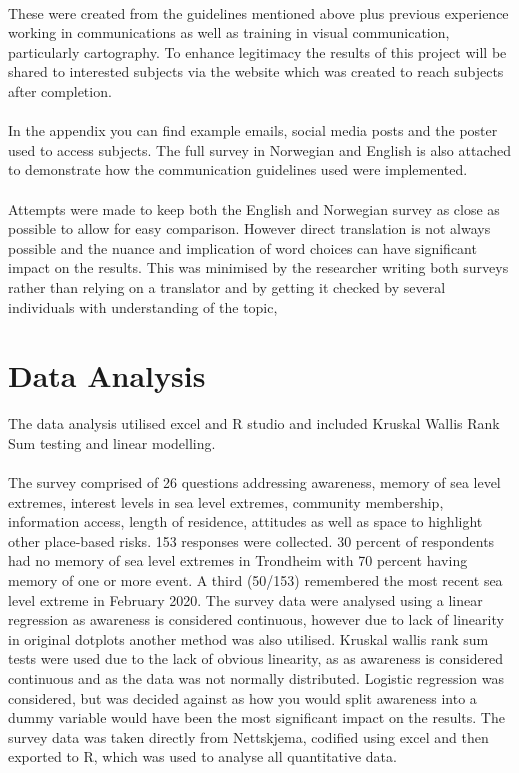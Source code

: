 \paragraph{}
These were created from the guidelines mentioned above plus previous experience working in communications as well as training in visual communication, particularly cartography. To enhance legitimacy the results of this project will be shared to interested subjects via the website which was created to reach subjects after completion. 
\paragraph{}
In the appendix you can find example emails, social media posts and the poster used to access subjects. The full survey in Norwegian and English is also attached to demonstrate how the communication guidelines used were implemented.
\paragraph{}

Attempts were made to keep both the English and Norwegian survey as close as possible to allow for easy comparison. However direct translation is not always possible and the nuance and implication of word choices can have significant impact on the results. This was minimised by the researcher writing both surveys rather than relying on a translator and by getting it checked by several individuals with understanding of the topic,



\section{Data Analysis}
 The data analysis utilised excel and R studio and included Kruskal Wallis Rank Sum testing and linear modelling. 
\paragraph{}
  The survey comprised of 26 questions addressing awareness, memory of sea level extremes, interest levels in sea level extremes, community membership, information access, length of residence, attitudes as well as space to highlight other place-based risks. 153 responses were collected. 30 percent of respondents had no memory of sea level extremes in Trondheim with 70 percent having memory of one or more event. A third (50/153) remembered the most recent sea level extreme in February 2020. The survey data were analysed using a linear regression as awareness is considered continuous, however due to lack of linearity in original dotplots another method was also utilised. Kruskal wallis rank sum tests were used due to the lack of obvious linearity, as as awareness is considered continuous and as the data was not normally distributed. Logistic regression was considered, but was decided against as how you would split awareness into a dummy variable would have been the most significant impact on the results. The survey data was taken directly from Nettskjema, codified using excel and then exported to R, which was used to analyse all quantitative data. 

